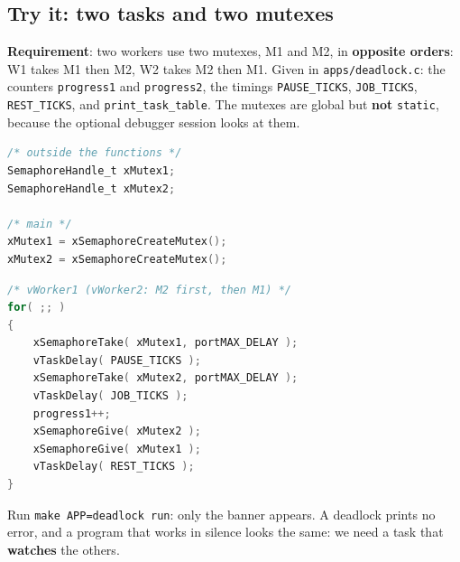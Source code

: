 \subsection{Try it: two tasks and two mutexes}
\textbf{Requirement}: two workers use two mutexes, M1 and M2, in \textbf{opposite orders}: W1 takes M1 then M2, W2 takes M2 then M1. Given in \texttt{apps/deadlock.c}: the counters \texttt{progress1} and \texttt{progress2}, the timings \texttt{PAUSE\_TICKS}, \texttt{JOB\_TICKS}, \texttt{REST\_TICKS}, and \texttt{print\_task\_table}. The mutexes are global but \textbf{not} \texttt{static}, because the optional debugger session looks at them.
\par\noindent\begin{minipage}[t]{0.42\textwidth}
\begin{lstlisting}[language=C, showstringspaces=false, basicstyle=\ttfamily\scriptsize]
/* outside the functions */
SemaphoreHandle_t xMutex1;
SemaphoreHandle_t xMutex2;

/* main */
xMutex1 = xSemaphoreCreateMutex();
xMutex2 = xSemaphoreCreateMutex();
\end{lstlisting}
\end{minipage}\hfill
\begin{minipage}[t]{0.55\textwidth}
\begin{lstlisting}[language=C, showstringspaces=false, basicstyle=\ttfamily\scriptsize]
/* vWorker1 (vWorker2: M2 first, then M1) */
for( ;; )
{
    xSemaphoreTake( xMutex1, portMAX_DELAY );
    vTaskDelay( PAUSE_TICKS );
    xSemaphoreTake( xMutex2, portMAX_DELAY );
    vTaskDelay( JOB_TICKS );
    progress1++;
    xSemaphoreGive( xMutex2 );
    xSemaphoreGive( xMutex1 );
    vTaskDelay( REST_TICKS );
}
\end{lstlisting}
\end{minipage}

\noindent Run \texttt{make APP=deadlock run}: only the banner appears. A deadlock prints no error, and a program that works in silence looks the same: we need a task that \textbf{watches} the others.


